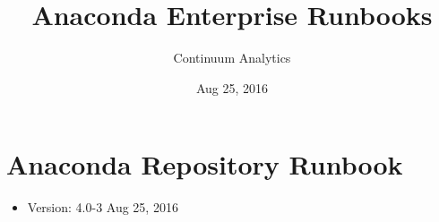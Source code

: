 \documentclass[letterpaper,10pt,openany,oneside]{sphinxmanual}
\title{Anaconda Enterprise Runbooks}
\date{Aug 25, 2016}
\author{Continuum Analytics}
\begin{document}
\maketitle
\tableofcontents
{}\label{index::doc}



\chapter{Anaconda Repository Runbook}
\label{AnacondaRepository:anaconda-repository-runbook}\label{AnacondaRepository::doc}\label{AnacondaRepository:continuum-analytics-anaconda-enterprise-deployment-runbooks}\begin{itemize}
\item {} 
Version: 4.0-3 \textbar{} Aug 25, 2016

\end{itemize}
\end{document}
